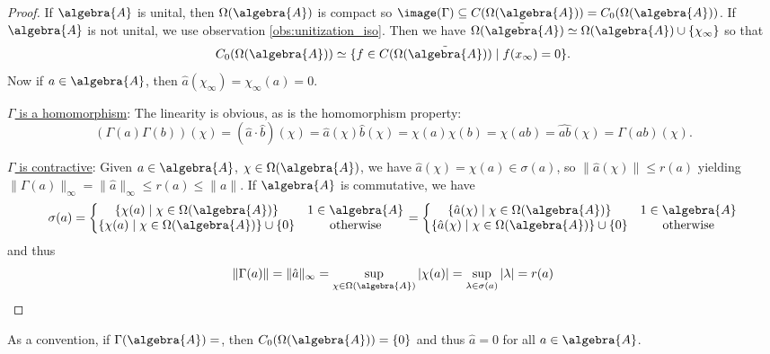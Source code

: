 \documentclass[a4paper]{article}
\begin{document}
\begin{proof}
	If $\algebra{A}$ is unital, then $\Omega(\algebra{A})$ is compact so $\image(\Gamma) \subseteq C(\Omega(\algebra{A})) = C_0(\Omega(\algebra{A}))$. If $\algebra{A}$ is not unital, we use observation \ref{obs:unitization_iso}. Then we have $\Omega(\tilde{\algebra{A}}) \simeq \Omega(\algebra{A}) \cup \{\chi_\infty\}$ so that
	\begin{equation*}
		C_0(\Omega(\algebra{A})) \simeq \{ f \in C(\Omega(\tilde{\algebra{A}})) \mid f(x_\infty) = 0 \}\text{.}
	\end{equation*}
	Now if $a \in \algebra{A}$, then $\hat a (\chi_\infty) = \chi_\infty(a) = 0$.

	\underline{$\Gamma$ is a homomorphism}: The linearity is obvious, as is the homomorphism property:
	\begin{equation*}
		(\Gamma(a) \Gamma(b))(\chi) = (\hat a \cdot \hat b)(\chi) = \hat a(\chi) \hat b (\chi) = \chi(a) \chi(b) = \chi(ab) = \hat{ab} (\chi) = \Gamma(ab)(\chi)\text{.}
	\end{equation*}

	\underline{$\Gamma$ is contractive}: Given $a \in \algebra{A}$, $\chi \in \Omega(\algebra{A})$, we have $\hat a (\chi) = \chi(a) \in \sigma(a)$, so $\|\hat a (\chi) \| \leq r(a)$ yielding $\|\Gamma(a)\|_\infty = \|\hat a\|_\infty \leq r(a) \leq \|a\|$. If $\algebra{A}$ is commutative, we have
	\begin{equation*}
		\sigma(a) = \left\{ \begin{matrix}
			\{\chi(a) \mid \chi \in \Omega(\algebra{A}) \}             & 1 \in \algebra{A} \\
			\{\chi(a) \mid \chi \in \Omega(\algebra{A}) \} \cup \{0 \} & \text{otherwise}
		\end{matrix} \right. = \left\{ \begin{matrix}
			\{ \hat a(\chi) \mid \chi \in \Omega(\algebra{A}) \}            & 1 \in \algebra{A} \\
			\{ \hat a(\chi) \mid \chi \in \Omega(\algebra{A}) \} \cup \{0\} & \text{otherwise}
		\end{matrix} \right.
	\end{equation*}
	and thus
	\begin{equation*}
		\|\Gamma(a)\| = \|\hat a \|_\infty = \sup_{\chi \in \Omega(\algebra{A})} | \chi(a) | = \sup_{\lambda \in \sigma(a)} |\lambda| = r(a)
	\end{equation*}
\end{proof}

As a convention, if $\Gamma(\algebra{A}) = \empty$, then $C_0(\Omega(\algebra{A})) = \{0\}$ and thus $\hat a = 0$ for all $a \in \algebra{A}$.
\end{document}
